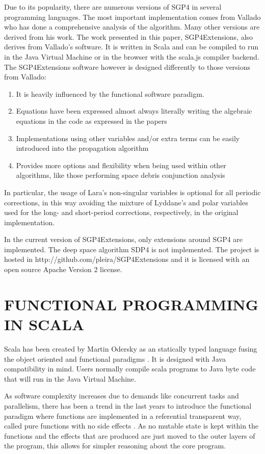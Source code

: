 \documentclass{article}
\begin{document}
Due to its popularity, there are numerous versions of SGP4 in several programming languages. The most important implementation comes from Vallado \cite{ValladoCrawfordHujsakKelso2006} who has done a comprehensive analysis of the algorithm. Many other versions are derived from his work. The work presented in this paper, SGP4Extensions, also derives from Vallado's software.
It is written in Scala and can be compiled to run in the Java Virtual Machine or in the browser with the scala.js compiler backend. The SGP4Extensions software however is designed differently to those versions from Vallado:
\begin{enumerate}
  \item  It is heavily influenced by the functional software paradigm.
  \item  Equations have been expressed almost always literally writing the algebraic equations in the code as expressed in the papers
  \item  Implementations using other variables and/or extra terms can be easily introduced into the propagation algorithm
  \item  Provides more options and flexibility when being used within other algorithms, like those performing space debris conjunction analysis
\end{enumerate}
In particular, the usage of Lara's non-singular variables \cite{Lara2015MPE} is optional for all periodic corrections, in this way avoiding the mixture of Lyddane's and polar variables used for the long- and short-period corrections, respectively, in the original implementation.

In the current version of SGP4Extensions, only extensions around SGP4 are implemented. The deep space algorithm SDP4 is not implemented.
The project is hosted in http://github.com/pleira/SGP4Extensions and it is licensed with an open source Apache Version 2 license.

\section{FUNCTIONAL PROGRAMMING IN SCALA}
\label{sec:scala}

Scala has been created by Martin Odersky as an statically typed language fusing the object oriented and functional paradigms \cite{scala-overview-tech-report}. It is designed with Java compatibility in mind. Users normally compile scala programs to Java byte code that will run in the Java Virtual Machine.

As software complexity increases due to demands like concurrent tasks and parallelism,
there has been a trend in the last years to introduce the functional paradigm where
functions are implemented in a referential transparent way, called pure functions
with no side effects \cite[p. ~3]{ChBj}. As no mutable state is kept within the functions and the effects that are produced are
just moved to the outer layers of the program, this allows for simpler reasoning about
the core program.
\end{document}
